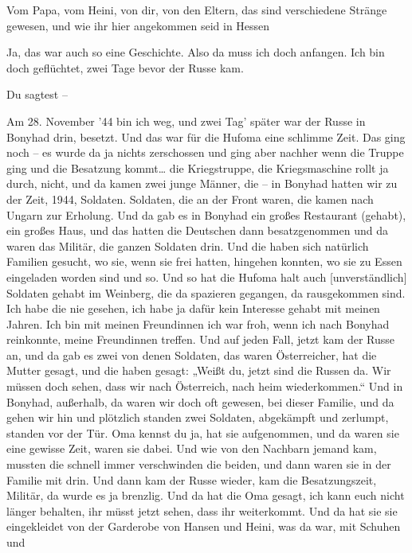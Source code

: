 \documentclass[ngerman,]{article}
\providecommand{\tightlist}{%
  \setlength{\itemsep}{0pt}\setlength{\parskip}{0pt}}
\begin{document}
\begin{multicols}{3}
\begin{description}
\tightlist
\item[Ruth]
Vom Papa, vom Heini, von dir, von den Eltern, das sind verschiedene
Stränge gewesen, und wie ihr hier angekommen seid in Hessen
\item[Käthe]
Ja, das war auch so eine Geschichte. Also da muss ich doch anfangen. Ich
bin doch geflüchtet, zwei Tage bevor der Russe kam.
\item[Ruth]
Du sagtest –
\item[Käthe]
Am 28. November '44 bin ich weg, und zwei Tag' später war der Russe in
Bonyhad drin, besetzt. Und das war für die Hufoma eine schlimme Zeit.
Das ging noch – es wurde da ja nichts zerschossen und ging aber nachher
wenn die Truppe ging und die Besatzung kommt\ldots{} die Kriegstruppe,
die Kriegsmaschine rollt ja durch, nicht, und da kamen zwei junge
Männer, die – in Bonyhad hatten wir zu der Zeit, 1944, Soldaten.
Soldaten, die an der Front waren, die kamen nach Ungarn zur Erholung.
Und da gab es in Bonyhad ein großes Restaurant (gehabt), ein großes
Haus, und das hatten die Deutschen dann besatzgenommen und da waren das
Militär, die ganzen Soldaten drin. Und die haben sich natürlich Familien
gesucht, wo sie, wenn sie frei hatten, hingehen konnten, wo sie zu Essen
eingeladen worden sind und so. Und so hat die Hufoma halt auch
{[}unverständlich{]} Soldaten gehabt im Weinberg, die da spazieren
gegangen, da rausgekommen sind. Ich habe die nie gesehen, ich habe ja
dafür kein Interesse gehabt mit meinen Jahren. Ich bin mit meinen
Freundinnen ich war froh, wenn ich nach Bonyhad reinkonnte, meine
Freundinnen treffen. Und auf jeden Fall, jetzt kam der Russe an, und da
gab es zwei von denen Soldaten, das waren Österreicher, hat die Mutter
gesagt, und die haben gesagt: „Weißt du, jetzt sind die Russen da. Wir
müssen doch sehen, dass wir nach Österreich, nach heim wiederkommen.“
Und in Bonyhad, außerhalb, da waren wir doch oft gewesen, bei dieser
Familie, und da gehen wir hin und plötzlich standen zwei Soldaten,
abgekämpft und zerlumpt, standen vor der Tür. Oma kennst du ja, hat sie
aufgenommen, und da waren sie eine gewisse Zeit, waren sie dabei. Und
wie von den Nachbarn jemand kam, mussten die schnell immer verschwinden
die beiden, und dann waren sie in der Familie mit drin. Und dann kam der
Russe wieder, kam die Besatzungszeit, Militär, da wurde es ja brenzlig.
Und da hat die Oma gesagt, ich kann euch nicht länger behalten, ihr
müsst jetzt sehen, dass ihr weiterkommt. Und da hat sie sie eingekleidet
von der Garderobe von Hansen und Heini, was da war, mit Schuhen und

\end{description}
\end{multicols}
\end{document}
